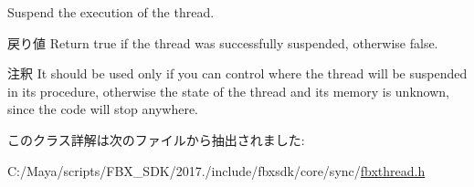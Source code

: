 Suspend the execution of the thread. \begin{DoxyReturn}{戻り値}
Return true if the thread was successfully suspended, otherwise false. 
\end{DoxyReturn}
\begin{DoxyRemark}{注釈}
It should be used only if you can control where the thread will be suspended in its procedure, otherwise the state of the thread and its memory is unknown, since the code will stop anywhere. 
\end{DoxyRemark}


このクラス詳解は次のファイルから抽出されました\+:\begin{DoxyCompactItemize}
\item 
C\+:/\+Maya/scripts/\+F\+B\+X\+\_\+\+S\+D\+K/2017./include/fbxsdk/core/sync/\hyperlink{fbxthread_8h}{fbxthread.\+h}\end{DoxyCompactItemize}
